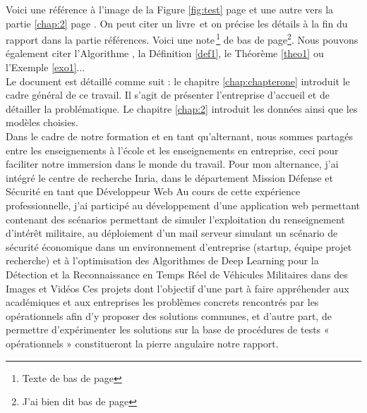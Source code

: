 


%
%


Voici une référence à l'image de la Figure \ref{fig:test} page \pageref{fig:test} et une autre vers la partie \ref{chap:2} page \pageref{chap:2}.
On peut citer un livre\, \cite{caillois1} et on précise les détails à la fin du rapport dans la partie références.
Voici une note\,\footnote{Texte de bas de page} de bas de page\footnote{J'ai bien dit bas de page}. Nous pouvons également citer l'Algorithme , la Définition \ref{def1}, le Théorème \ref{theo1} ou l'Exemple \ref{exo1}...\\

Le document est détaillé comme suit : le chapitre \ref{chap:chapterone} introduit le cadre général de ce travail. Il s'agit de présenter l'entreprise d'accueil et de détailler la problématique. Le chapitre \ref{chap:2} introduit les données ainsi que les modèles choisies.\\


Dans le cadre de notre formation et en tant qu’alternant, nous sommes partagés entre les
enseignements à l’école et les enseignements en entreprise, ceci pour faciliter notre immersion
dans le monde du travail. Pour mon alternance, j’ai intégré le centre de recherche Inria, dans le département Mission Défense et Sécurité en tant que Développeur Web
Au cours de cette expérience professionnelle, j’ai participé au développement d'une application web permettant contenant des scénarios permettant de simuler l'exploitation du renseignement d'intérêt militaire,
au déploiement d'un mail serveur simulant un scénario de sécurité économique dans un environnement d'entreprise (startup, équipe projet recherche) et
à l'optimisation des Algorithmes de Deep Learning pour la Détection et la Reconnaissance en Temps Réel de Véhicules  Militaires dans des Images et Vidéos
Ces projets dont l’objectif d’une part à faire appréhender aux académiques et aux entreprises les problèmes
concrets rencontrés par les opérationnels afin d’y proposer des solutions communes, et
d’autre part, de permettre d’expérimenter les solutions sur la base de procédures de tests
« opérationnels » constitueront la pierre angulaire notre rapport.
